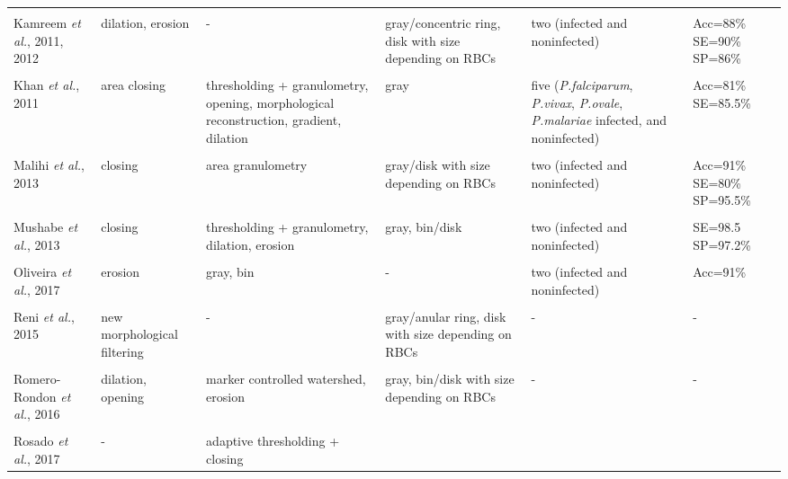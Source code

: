 \begin{longtable}{C{2.1cm} C{2.7cm} C{2.2cm} C{2.0cm} C{2.7cm} C{2.0cm} }
&   &  &  &  & \\
    Kamreem \emph{et al.}, 2011, 2012  &
    	dilation, erosion &
    	-  &
    	gray/concentric ring, disk with size depending on RBCs  &
    	two (infected and noninfected) &
    	Acc=88\% SE=90\% SP=86\%
    \\	
&   &  &  &  & \\
    Khan \emph{et al.}, 2011  &
    	area closing &
    	thresholding + granulometry, opening, morphological reconstruction, gradient, dilation &
    	gray &
    	five (\emph{P.falciparum}, \emph{P.vivax}, \emph{P.ovale}, \emph{P.malariae} infected, and noninfected) &
    	Acc=81\% SE=85.5\%
    \\	
&   &  &  &  & \\
    Malihi \emph{et al.}, 2013  &
    	closing &
    	area granulometry  &
    	gray/disk with size depending on RBCs &
    	two (infected and noninfected) &
    	Acc=91\% SE=80\% SP=95.5\%
    \\	
&   &  &  &  & \\
    Mushabe \emph{et al.}, 2013  &
    	closing &
    	thresholding + granulometry, dilation, erosion  &
    	gray, bin/disk &
    	two (infected and noninfected) &
    	SE=98.5 SP=97.2\%
    \\	
&   &  &  &  & \\
    Oliveira \emph{et al.}, 2017  &
    	erosion &
    	gray, bin  &
    	- &
    	two (infected and noninfected) &
    	Acc=91\%
    \\
&   &  &  &  & \\
    Reni \emph{et al.}, 2015  &
    	new morphological filtering &
    	-  &
    	gray/anular ring, disk with size depending on RBCs &
    	- &
    	-
    \\
&   &  &  &  & \\
    Romero-Rondon \emph{et al.}, 2016  &
    	dilation, opening &
    	marker controlled watershed, erosion  &
    	gray, bin/disk with size depending on RBCs &
    	- &
    	-
    \\
&   &  &  &  & \\
    Rosado \emph{et al.}, 2017  &
    	- &
    	adaptive thresholding + closing  &

\end{longtable}
